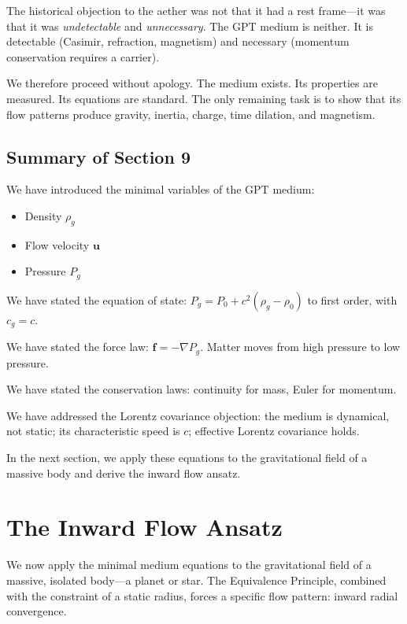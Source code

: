 \documentclass[12pt, a4paper]{article}
\begin{document}
The historical objection to the aether was not that it had a rest frame—it was that it was \textit{undetectable} and \textit{unnecessary}. The GPT medium is neither. It is detectable (Casimir, refraction, magnetism) and necessary (momentum conservation requires a carrier).

We therefore proceed without apology. The medium exists. Its properties are measured. Its equations are standard. The only remaining task is to show that its flow patterns produce gravity, inertia, charge, time dilation, and magnetism.

\subsection{Summary of Section 9}
\label{subsec:summary_9}

We have introduced the minimal variables of the GPT medium:

\begin{itemize}
    \item Density \( \rho_g \)
    \item Flow velocity \( \mathbf{u} \)
    \item Pressure \( P_g \)
\end{itemize}

We have stated the equation of state: \( P_g = P_0 + c^2 (\rho_g - \rho_0) \) to first order, with \( c_g = c \).

We have stated the force law: \( \mathbf{f} = -\nabla P_g \). Matter moves from high pressure to low pressure.

We have stated the conservation laws: continuity for mass, Euler for momentum.

We have addressed the Lorentz covariance objection: the medium is dynamical, not static; its characteristic speed is \( c \); effective Lorentz covariance holds.

In the next section, we apply these equations to the gravitational field of a massive body and derive the inward flow ansatz.

\section{The Inward Flow Ansatz}
\label{sec:inward_flow}

We now apply the minimal medium equations to the gravitational field of a massive, isolated body—a planet or star. The Equivalence Principle, combined with the constraint of a static radius, forces a specific flow pattern: inward radial convergence.
\end{document}
